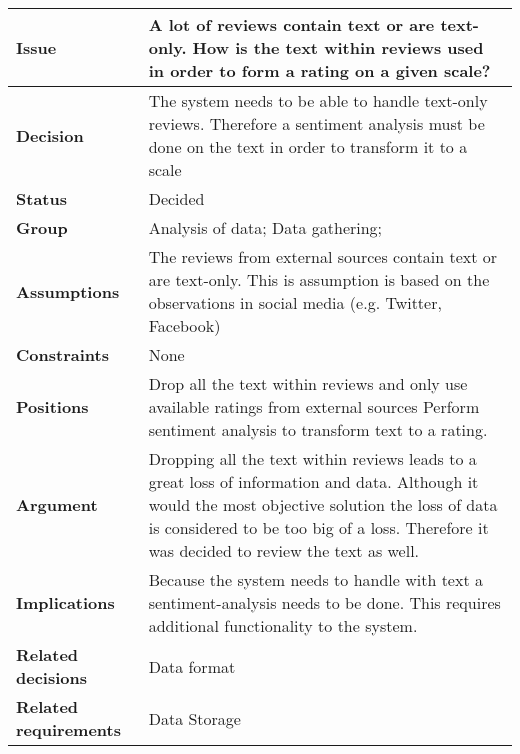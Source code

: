 
\begin{tabular}{ l  p{10cm}}
\hline
\bf Issue & A lot of reviews contain text or are text-only. How is the text within reviews used in order to form a rating on a given scale?\\
\hline
\bf Decision & The system needs to be able to handle text-only reviews. Therefore a sentiment analysis must be done on the text in order to transform it to a scale\\
\hline
\bf Status & Decided\\
\hline
\bf Group & Analysis of data; Data gathering; \\
\hline
\bf Assumptions & The reviews from external sources contain text or are text-only. This is assumption is based on the observations in social media (e.g. Twitter, Facebook) \\
\hline
\bf Constraints & None \\
\hline
\bf Positions & Drop all the text within reviews and only use available ratings from external sources \newline\newline
Perform sentiment analysis to transform text to a rating. \\
\hline
\bf Argument & Dropping all the text within reviews leads to a great loss of information and data. Although it would the most objective solution the loss of data is considered to be too big of a loss. Therefore it was decided to review the text as well. \\
\hline
\bf Implications & Because the system needs to handle with text a sentiment-analysis needs to be done. This requires additional functionality to the system.\\
\hline
\bf Related decisions & Data format \\
\hline
\bf Related requirements  & Data Storage \\
\hline
\end{tabular}
